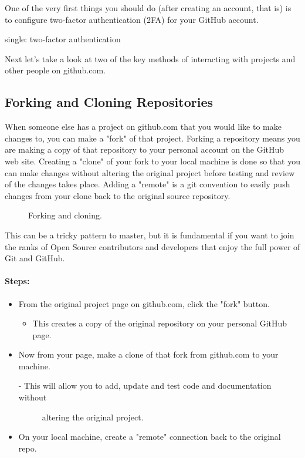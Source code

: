 \justify
One of the very first things you should do (after creating an account,
that is) is to configure two-factor authentication (2FA) for your
GitHub account.

single: two-factor authentication

\justify
Next let's take a look at two of the key methods of interacting with
projects and other people on github.com.

\subsection{Forking and Cloning Repositories}
\justify
When someone else has a project on github.com that you would like to make changes to, you can make a "fork" of that project. Forking a repository means you are making a copy of that repository to your personal account on the GitHub web site.
\justify
Creating a "clone" of your fork to your local machine is done so that
you can make changes without altering the original project before testing and review of the changes takes place.
\justify
Adding a "remote" is a git convention to easily push changes from your clone back to the original source repository.

\begin{figure}[!htb]
      
      \caption{Forking and cloning.}
\end{figure}

\justify
This can be a tricky pattern to master, but it is fundamental if you
want to join the ranks of Open Source contributors and developers that
enjoy the full power of Git and GitHub.

\paragraph{Steps:}

\begin{itemize}
      \item
            From the original project page on github.com, click the "fork" button.

            \begin{itemize}

                  \item
                        This creates a copy of the original repository on your personal
                        GitHub page.
            \end{itemize}
      \item
            Now from your page, make a clone of that fork from github.com to your
            machine.

            \begin{description}
                  \item[- This will allow you to add, update and test code and
                        documentation without]
                        altering the original project.
            \end{description}
      \item
            On your local machine, create a "remote" connection back to the
            original repo.
\end{itemize}

